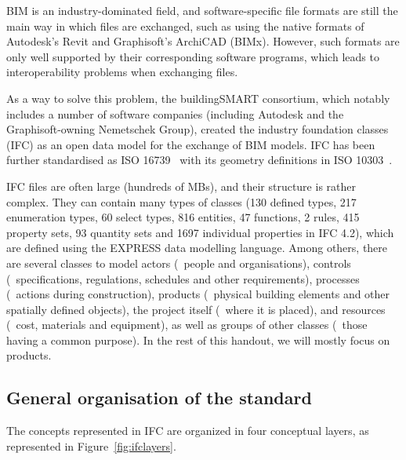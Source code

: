 BIM is an industry-dominated field, and software-specific file formats are still the main way in which files are exchanged, such as using the native formats of Autodesk's Revit and Graphisoft's ArchiCAD (BIMx).
However, such formats are only well supported by their corresponding software programs, which leads to interoperability problems when exchanging files.

As a way to solve this problem, the buildingSMART consortium, which notably includes a number of software companies (including Autodesk and the Graphisoft-owning Nemetschek Group), created the industry foundation classes (IFC) as an open data model for the exchange of BIM models.
IFC has been further standardised as ISO 16739~\citep{ISO16739:2013} with its geometry definitions in ISO 10303~\citep{ISO10303:2014}.

IFC files are often large (hundreds of MBs), and their structure is rather complex.
They can contain many types of classes (130 defined types, 217 enumeration types, 60 select types, 816 entities, 47 functions, 2 rules, 415 property sets, 93 quantity sets and 1697 individual properties in IFC 4.2), which are defined using the EXPRESS data modelling language.
Among others, there are several classes to model actors (\eg\ people and organisations), controls (\eg\ specifications, regulations, schedules and other requirements), processes (\eg\ actions during construction), products (\eg\ physical building elements and other spatially defined objects), the project itself (\eg\ where it is placed), and resources (\eg\ cost, materials and equipment), as well as groups of other classes (\eg\ those having a common purpose).
In the rest of this handout, we will mostly focus on products.

\subsection{General organisation of the standard}

The concepts represented in IFC are organized in four conceptual layers, as represented in Figure~\ref{fig:ifclayers}.

